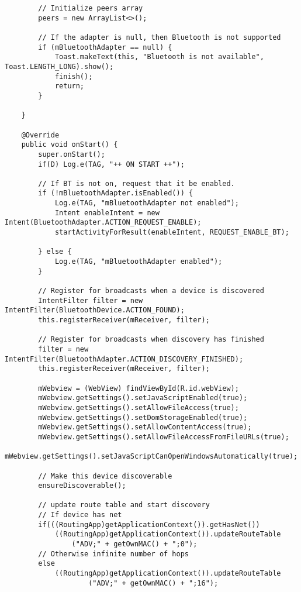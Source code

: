 \begin{verbatim}
        // Initialize peers array
        peers = new ArrayList<>();

        // If the adapter is null, then Bluetooth is not supported
        if (mBluetoothAdapter == null) {
            Toast.makeText(this, "Bluetooth is not available", Toast.LENGTH_LONG).show();
            finish();
            return;
        }

    }

    @Override
    public void onStart() {
        super.onStart();
        if(D) Log.e(TAG, "++ ON START ++");

        // If BT is not on, request that it be enabled.
        if (!mBluetoothAdapter.isEnabled()) {
            Log.e(TAG, "mBluetoothAdapter not enabled");
            Intent enableIntent = new Intent(BluetoothAdapter.ACTION_REQUEST_ENABLE);
            startActivityForResult(enableIntent, REQUEST_ENABLE_BT);

        } else {
            Log.e(TAG, "mBluetoothAdapter enabled");
        }

        // Register for broadcasts when a device is discovered
        IntentFilter filter = new IntentFilter(BluetoothDevice.ACTION_FOUND);
        this.registerReceiver(mReceiver, filter);

        // Register for broadcasts when discovery has finished
        filter = new IntentFilter(BluetoothAdapter.ACTION_DISCOVERY_FINISHED);
        this.registerReceiver(mReceiver, filter);

        mWebview = (WebView) findViewById(R.id.webView);
        mWebview.getSettings().setJavaScriptEnabled(true);
        mWebview.getSettings().setAllowFileAccess(true);
        mWebview.getSettings().setDomStorageEnabled(true);
        mWebview.getSettings().setAllowContentAccess(true);
        mWebview.getSettings().setAllowFileAccessFromFileURLs(true);
        mWebview.getSettings().setJavaScriptCanOpenWindowsAutomatically(true);

        // Make this device discoverable
        ensureDiscoverable();

        // update route table and start discovery
        // If device has net
        if(((RoutingApp)getApplicationContext()).getHasNet())
            ((RoutingApp)getApplicationContext()).updateRouteTable
                ("ADV;" + getOwnMAC() + ";0");
        // Otherwise infinite number of hops
        else
            ((RoutingApp)getApplicationContext()).updateRouteTable
                    ("ADV;" + getOwnMAC() + ";16");


\end{verbatim}
